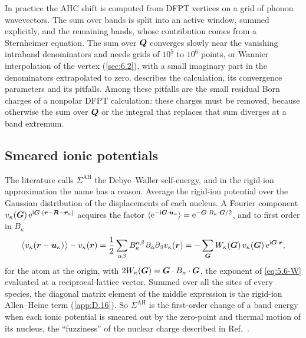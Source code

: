 In practice the AHC shift is computed from DFPT vertices on a grid of phonon wavevectors. The sum over bands is split into an active window, summed explicitly, and the remaining bands, whose contribution comes from a Sternheimer equation. The sum over $\bm{Q}$ converges slowly near the vanishing intraband denominators and needs grids of $10^5$ to $10^6$ points, or Wannier interpolation of the vertex (\cref{sec:6.2}), with a small imaginary part in the denominators extrapolated to zero.  describes the calculation, its convergence parameters and its pitfalls. Among these pitfalls are the small residual Born charges of a nonpolar DFPT calculation: these charges must be removed, because otherwise the sum over $\bm{Q}$ or the integral that replaces that sum diverges at a band extremum.

\subsection{Smeared ionic potentials}

The literature calls $\Sigma^{\mathrm{AH}}$ the Debye--Waller self-energy, and in the rigid-ion approximation the name has a reason. Average the rigid-ion potential over the Gaussian distribution of the displacements of each nucleus. A Fourier component $v_\kappa(\bm{G})\,\mathrm{e}^{\mathrm{i}\bm{G}\cdot(\bm{r} - \bm{R} - \bm{\tau}_\kappa)}$ acquires the factor $\langle\mathrm{e}^{-\mathrm{i}\bm{G}\cdot\bm{u}_\kappa}\rangle = \mathrm{e}^{-\bm{G}\cdot B_\kappa\cdot\bm{G}/2}$, and to first order in $B_\kappa$
\begin{equation}
  \bigl\langle v_\kappa(\bm{r} - \bm{u}_\kappa)\bigr\rangle - v_\kappa(\bm{r}) = \frac12\sum_{\alpha\beta}B^{\alpha\beta}_\kappa\,\partial_\alpha\partial_\beta v_\kappa(\bm{r}) = -\sum_{\bm{G}}W_\kappa(\bm{G})\,v_\kappa(\bm{G})\,\mathrm{e}^{\mathrm{i}\bm{G}\cdot\bm{r}} ,
  \label{eq:6.3-smear}
\end{equation}
for the atom at the origin, with $2W_\kappa(\bm{G}) = \bm{G}\cdot B_\kappa\cdot\bm{G}$, the exponent of \cref{eq:5.6-W} evaluated at a reciprocal-lattice vector. Summed over all the sites of every species, the diagonal matrix element of the middle expression is the rigid-ion Allen--Heine term (\cref{app:D.16}). So $\Sigma^{\mathrm{AH}}$ is the first-order change of a band energy when each ionic potential is smeared out by the zero-point and thermal motion of its nucleus, the ``fuzziness'' of the nuclear charge described in Ref.~\cite[below Eq.~(154)]{giustino2017electron}.

